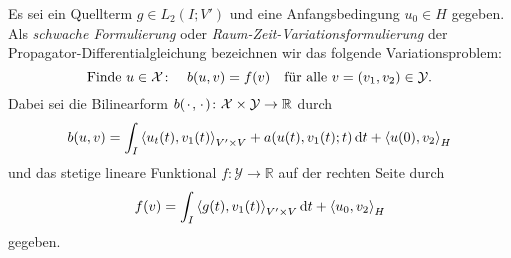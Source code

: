 \begin{Definition}
\label{definition:schwache_formulierung}
    Es sei ein Quellterm $g \in L_{2}(I; V')$ und eine Anfangsbedingung $u_{0} \in H$ gegeben.
    Als \emph{schwache Formulierung} oder \emph{Raum-Zeit-Variationsformulierung} der Propagator-Differentialgleichung bezeichnen wir das folgende Variationsproblem:
    \begin{equation}
    \label{eq:ps:rzvp:schwache_formulierung}
        \text{Finde}~u \in \mathcal X \colon \quad  b(u, v) = f(v) \quad \fa v = (v_{1}, v_{2}) \in \mathcal Y.
    \end{equation}
    Dabei sei die Bilinearform $b({\mkern2mu\cdot\mkern2mu}, {\mkern2mu\cdot\mkern2mu}) \colon \mathcal X \times \mathcal Y \to \mathbb{R}$ durch
    \begin{equation}
        \label{eq:ps:rzvp:schwache_formulierung_lhs_b}
        b(u, v)
            = \int_{I} \skprod{u_{t}(t)}{v_{1}(t)}_{V' \times V} + a(u(t), v_{1}(t); t) \diff t + \skprod{u(0)}{v_{2}}_{H}
    \end{equation}
    und das stetige lineare Funktional $f \colon \mathcal Y \to \mathbb{R}$ auf der rechten Seite durch
    \begin{equation}
        \label{eq:ps:rzvp:schwache_formulierung_rhs_f}
        f(v) = \int_{I} \skprod{g(t)}{v_{1}(t)}_{V' \times V} \diff t + \skprod{u_{0}}{v_{2}}_{H}
    \end{equation}
    gegeben.
\end{Definition}

